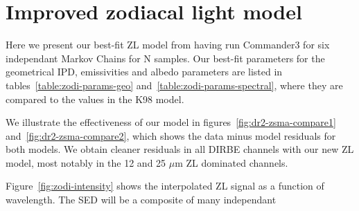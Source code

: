 \documentclass[twocolumn]{aa}
\begin{document}
\section{Improved zodiacal light model}\label{sect:improved-model}
Here we present our best-fit ZL model from having run Commander3 for six independant
Markov Chains for N samples. Our best-fit parameters for the geometrical IPD, emissivities 
and albedo parameters are listed in tables~\ref{table:zodi-params-geo} 
and~\ref{table:zodi-params-spectral}, where they are compared to the values in the K98 model.


We illustrate the effectiveness of our model in figures~\ref{fig:dr2-zsma-compare1} 
and~\ref{fig:dr2-zsma-compare2}, which shows the data minus model residuals for both models.
We obtain cleaner residuals in all DIRBE channels with our new ZL model, most notably in the 12 and 25 $\mu$m  
ZL dominated channels.

Figure~\ref{fig:zodi-intensity} shows the interpolated ZL signal as a function of wavelength. The SED will be a composite of many independant 
\end{document}
